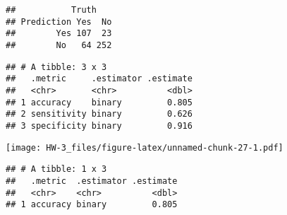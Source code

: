 \documentclass[]{article}
\newenvironment{Shaded}{\begin{snugshade}}{\end{snugshade}}
\newcommand{\DataTypeTok}[1]{\textcolor[rgb]{0.13,0.29,0.53}{#1}}
\newcommand{\KeywordTok}[1]{\textcolor[rgb]{0.13,0.29,0.53}{\textbf{#1}}}
\newcommand{\NormalTok}[1]{#1}
\newcommand{\OperatorTok}[1]{\textcolor[rgb]{0.81,0.36,0.00}{\textbf{#1}}}
\newcommand{\StringTok}[1]{\textcolor[rgb]{0.31,0.60,0.02}{#1}}
\begin{document}
\begin{verbatim}
##           Truth
## Prediction Yes  No
##        Yes 107  23
##        No   64 252
\end{verbatim}

\begin{Shaded}
\end{Shaded}

\begin{verbatim}
## # A tibble: 3 x 3
##   .metric     .estimator .estimate
##   <chr>       <chr>          <dbl>
## 1 accuracy    binary         0.805
## 2 sensitivity binary         0.626
## 3 specificity binary         0.916
\end{verbatim}

\begin{Shaded}
\end{Shaded}

\texttt{[image: HW-3\_files/figure-latex/unnamed-chunk-27-1.pdf]}

\begin{Shaded}
\end{Shaded}

\begin{verbatim}
## # A tibble: 1 x 3
##   .metric  .estimator .estimate
##   <chr>    <chr>          <dbl>
## 1 accuracy binary         0.805
\end{verbatim}
\end{document}
